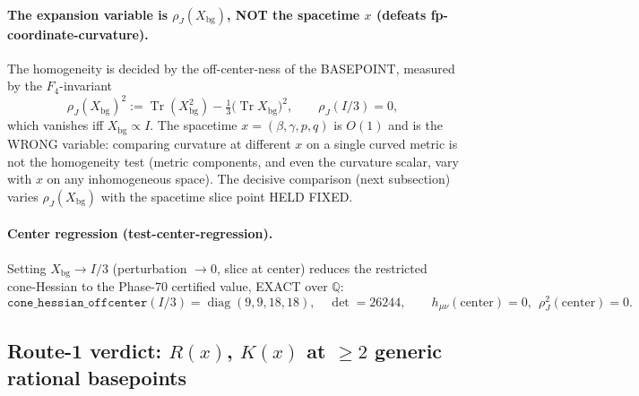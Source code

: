 \paragraph{The expansion variable is $\rho_J(X_{\mathrm{bg}})$, NOT the spacetime
$x$ (defeats fp-coordinate-curvature).}
The homogeneity is decided by the off-center-ness of the BASEPOINT, measured by the
$F_4$-invariant
\begin{equation}
  \rho_J(X_{\mathrm{bg}})^2 := \operatorname{Tr}(X_{\mathrm{bg}}^2)
    - \tfrac13\big(\operatorname{Tr} X_{\mathrm{bg}}\big)^2,
  \qquad \rho_J(I/3) = 0,
  \label{eq:rhoJ}
\end{equation}
which vanishes iff $X_{\mathrm{bg}}\propto I$. The spacetime $x=(\beta,\gamma,p,q)$
is $O(1)$ and is the WRONG variable: comparing curvature at different $x$ on a
single curved metric is not the homogeneity test (metric components, and even the
curvature scalar, vary with $x$ on any inhomogeneous space). The decisive
comparison (next subsection) varies $\rho_J(X_{\mathrm{bg}})$ with the spacetime
slice point HELD FIXED.

\paragraph{Center regression (test-center-regression).}
Setting $X_{\mathrm{bg}}\to I/3$ (perturbation $\to 0$, slice at center) reduces the
restricted cone-Hessian to the Phase-70 certified value, EXACT over $\mathbb{Q}$:
\begin{equation}
  \texttt{cone\_hessian\_offcenter}(I/3) = \operatorname{diag}(9,9,18,18),
  \quad \det = 26244,
  \qquad h_{\mu\nu}(\text{center}) = 0,\ \ \rho_J^2(\text{center}) = 0.
  \label{eq:center-reg}
\end{equation}

\subsection{Route-1 verdict: $R(x)$, $K(x)$ at $\ge 2$ generic rational basepoints}
\label{sec:verdict}

